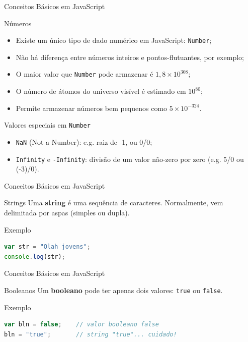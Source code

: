 \documentclass[xcolor=dvipsnames,table]{beamer}
\begin{document}
\begin{frame}[fragile]{Conceitos Básicos em JavaScript}
	\begin{block}{Números}
		\begin{itemize}
			\item Existe um único tipo de dado numérico em JavaScript: {\tt Number}; \pause
			\item Não há diferença entre números inteiros e pontos-flutuantes, por exemplo; \pause 
			\item O maior valor que {\tt Number} pode armazenar é $1,8 \times 10^{308}$; \pause
			\item O número de átomos do universo visível é estimado em $10^{80}$; \pause
			\item Permite armazenar números bem pequenos como $5 \times 10^{-324}$.
		\end{itemize}	
	\end{block} \pause
	\begin{block}{Valores especiais em {\tt Number}}
		\begin{itemize}
			\item {\tt NaN} (Not a Number): e.g. raiz de -1, ou 0/0; \pause
			\item {\tt Infinity} e {\tt -Infinity}: divisão de um valor não-zero por zero (e.g. 5/0 ou (-3)/0).
		\end{itemize}
	\end{block}
\end{frame}

\begin{frame}[fragile]{Conceitos Básicos em JavaScript}
	\begin{block}{Strings}
		Uma {\bf string} é uma sequência de caracteres. Normalmente, vem delimitada por aspas (simples ou dupla).
	\end{block} \pause
	\begin{block}{Exemplo}
		\begin{lstlisting}[language=JavaScript]
var str = "Olah jovens";
console.log(str);
\end{lstlisting}	
	\end{block}
\end{frame}

\begin{frame}[fragile]{Conceitos Básicos em JavaScript}
	\begin{block}{Booleanos}
		Um {\bf booleano} pode ter apenas dois valores: {\tt true} ou {\tt false}.
	\end{block} \pause
	\begin{block}{Exemplo}
		\begin{lstlisting}[language=JavaScript]
var bln = false;	// valor booleano false
bln = "true";		// string "true"... cuidado!
\end{lstlisting}	
	\end{block}
\end{frame}
\end{document}
